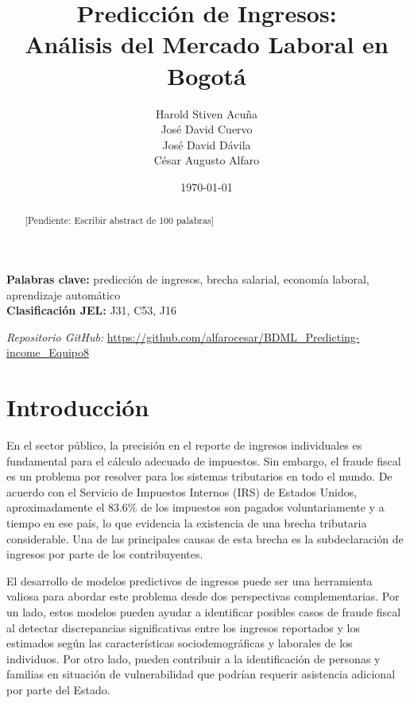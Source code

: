 \documentclass[12pt,a4paper,onecolumn]{article}
\title{Predicción de Ingresos: \\ Análisis del Mercado Laboral en Bogotá}
\author{%
\begin{center}

Harold Stiven Acuña\\
José David Cuervo\\
José David Dávila\\
César Augusto Alfaro
\end{center}%
}
\date{\today}
\begin{document}
\maketitle
\thispagestyle{empty}


\begin{abstract}
[Pendiente: Escribir abstract de 100 palabras]
\end{abstract}

\medskip

\begin{flushleft}
    {\bf Palabras clave:} predicción de ingresos, brecha salarial, economía laboral, aprendizaje automático \\
    {\bf Clasificación JEL:} J31, C53, J16
\end{flushleft}

\begin{center}
    \textit{Repositorio GitHub:} \url{https://github.com/alfarocesar/BDML_Predicting-income_Equipo8}
\end{center}

\pagebreak
\doublespacing


\section{Introducción}

En el sector público, la precisión en el reporte de ingresos individuales es fundamental para el cálculo adecuado de impuestos. Sin embargo, el fraude fiscal es un problema por resolver para los sistemas tributarios en todo el mundo. De acuerdo con el Servicio de Impuestos Internos (IRS) de Estados Unidos, aproximadamente el 83.6\% de los impuestos son pagados voluntariamente y a tiempo en ese país, lo que evidencia la existencia de una brecha tributaria considerable. Una de las principales causas de esta brecha es la subdeclaración de ingresos por parte de los contribuyentes.


El desarrollo de modelos predictivos de ingresos puede ser una herramienta valiosa para abordar este problema desde dos perspectivas complementarias. Por un lado, estos modelos pueden ayudar a identificar posibles casos de fraude fiscal al detectar discrepancias significativas entre los ingresos reportados y los estimados según las características sociodemográficas y laborales de los individuos. Por otro lado, pueden contribuir a la identificación de personas y familias en situación de vulnerabilidad que podrían requerir asistencia adicional por parte del Estado.
\end{document}
